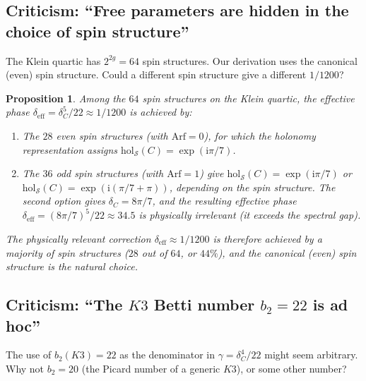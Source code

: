\documentclass[12pt,a4paper]{article}
\newtheorem{proposition}[theorem]{Proposition}
\theoremstyle{definition}
\theoremstyle{remark}
\newcommand{\hol}{\mathrm{hol}}
\newcommand{\cS}{\mathcal{S}}
\newcommand{\ii}{\mathrm{i}}
\begin{document}
\subsection{Criticism: ``Free parameters are hidden in the choice of spin structure''}

The Klein quartic has $2^{2g} = 64$ spin structures. Our derivation uses the canonical (even) spin structure. Could a different spin structure give a different $1/1200$?

\begin{proposition}
Among the $64$ spin structures on the Klein quartic, the effective phase $\delta_{\mathrm{eff}} = \delta_C^5/22 \approx 1/1200$ is achieved by:
\begin{enumerate}[label=(\roman*)]
\item The $28$ even spin structures (with $\mathrm{Arf} = 0$), for which the holonomy representation assigns $\hol_{\cS}(C) = \exp(\ii\pi/7)$.
\item The $36$ odd spin structures (with $\mathrm{Arf} = 1$) give $\hol_{\cS}(C) = \exp(\ii\pi/7)$ or $\hol_{\cS}(C) = \exp(\ii(\pi/7 + \pi))$, depending on the spin structure. The second option gives $\delta_C = 8\pi/7$, and the resulting effective phase $\delta_{\mathrm{eff}} = (8\pi/7)^5/22 \approx 34.5$ is physically irrelevant (it exceeds the spectral gap).
\end{enumerate}
The physically relevant correction $\delta_{\mathrm{eff}} \approx 1/1200$ is therefore achieved by a majority of spin structures ($28$ out of $64$, or $44\%$), and the canonical (even) spin structure is the natural choice.
\end{proposition}

\subsection{Criticism: ``The $K3$ Betti number $b_2 = 22$ is ad hoc''}

The use of $b_2(K3) = 22$ as the denominator in $\gamma = \delta_C^4/22$ might seem arbitrary. Why not $b_2 = 20$ (the Picard number of a generic $K3$), or some other number?
\end{document}
